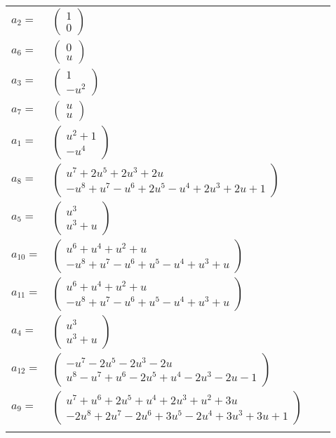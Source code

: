 \documentclass[1p]{elsarticle_modified}
\theoremstyle{definition}
\begin{document}
\begin{tabular}{m{7pt} m{180pt} m{7pt} m{180pt} }
\flushright $a_{2}=$&$\begin{pmatrix}1\\0\end{pmatrix}$ \\
\flushright $a_{6}=$&$\begin{pmatrix}0\\u\end{pmatrix}$ \\
\flushright $a_{3}=$&$\begin{pmatrix}1\\- u^2\end{pmatrix}$ \\
\flushright $a_{7}=$&$\begin{pmatrix}u\\u\end{pmatrix}$ \\
\flushright $a_{1}=$&$\begin{pmatrix}u^2+1\\- u^4\end{pmatrix}$ \\
\flushright $a_{8}=$&$\begin{pmatrix}u^7+2 u^5+2 u^3+2 u\\- u^8+u^7- u^6+2 u^5- u^4+2 u^3+2 u+1\end{pmatrix}$ \\
\flushright $a_{5}=$&$\begin{pmatrix}u^3\\u^3+u\end{pmatrix}$ \\
\flushright $a_{10}=$&$\begin{pmatrix}u^6+u^4+u^2+u\\- u^8+u^7- u^6+u^5- u^4+u^3+u\end{pmatrix}$ \\
\flushright $a_{11}=$&$\begin{pmatrix}u^6+u^4+u^2+u\\- u^8+u^7- u^6+u^5- u^4+u^3+u\end{pmatrix}$ \\
\flushright $a_{4}=$&$\begin{pmatrix}u^3\\u^3+u\end{pmatrix}$ \\
\flushright $a_{12}=$&$\begin{pmatrix}- u^7-2 u^5-2 u^3-2 u\\u^8- u^7+u^6-2 u^5+u^4-2 u^3-2 u-1\end{pmatrix}$ \\
\flushright $a_{9}=$&$\begin{pmatrix}u^7+u^6+2 u^5+u^4+2 u^3+u^2+3 u\\-2 u^8+2 u^7-2 u^6+3 u^5-2 u^4+3 u^3+3 u+1\end{pmatrix}$\\&\end{tabular}
\end{document}
